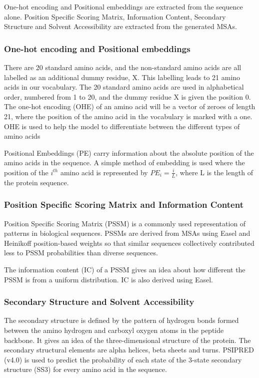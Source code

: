 \documentclass[journal=jacsat,manuscript=article]{achemso}
\begin{document}
One-hot encoding and Positional embeddings are extracted from the sequence alone. Position Specific Scoring Matrix, Information Content, Secondary Structure and Solvent Accessibility are extracted from the generated MSAs.

\subsubsection{One-hot encoding and Positional embeddings}
\quad There are 20 standard amino acids, and the non-standard amino acids are all labelled as an additional dummy residue, X. This labelling leads to 21 amino acids in our vocabulary. The 20 standard amino acids are used in alphabetical order, numbered from 1 to 20, and the dummy residue X is given the position 0. The one-hot encoding (OHE) of an amino acid will be a vector of zeroes of length 21, where the position of the amino acid in the vocabulary is marked with a one. OHE is used to help the model to differentiate between the different types of amino acids

Positional Embeddings (PE) carry information about the absolute position of the amino acids in the sequence. A simple method of embedding is used where the position of the $i^{th}$ amino acid is represented by ${PE}_{i} = \frac{i}{L}$, where L is the length of the protein sequence.

\subsubsection{Position Specific Scoring Matrix and Information Content}
\quad Position Specific Scoring Matrix (PSSM) is a commonly used representation of patterns in biological sequences. PSSMs are derived from MSAs using Easel \cite{potter2018hmmer} and Heinikoff position-based weights so that similar sequences collectively contributed less to PSSM probabilities than diverse sequences.

The information content (IC) of a PSSM gives an idea about how different the PSSM is from a uniform distribution. IC is also derived using Easel.

\subsubsection{Secondary Structure and Solvent Accessibility}
\quad The secondary structure is defined by the pattern of hydrogen bonds formed between the amino hydrogen and carboxyl oxygen atoms in the peptide backbone. It gives an idea of the three-dimensional structure of the protein. The secondary structural elements are alpha helices, beta sheets and turns. PSIPRED (v4.0) \cite{jones1999protein} is used to predict the probability of each state of the 3-state secondary structure (SS3) for every amino acid in the sequence.
\end{document}
